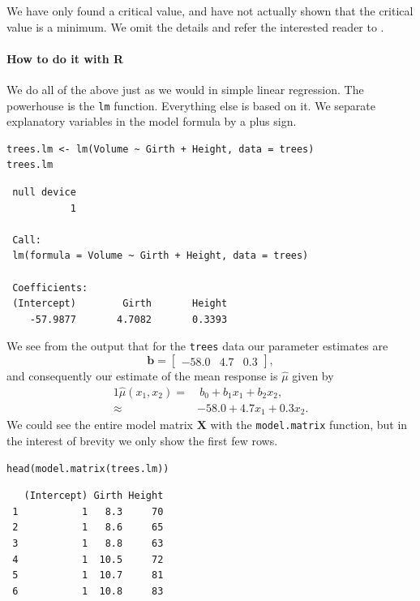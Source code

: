 \documentclass[captions=tableheading]{scrbook}
\begin{document}
\begin{rem}
We have only found a critical value, and have not actually shown that the critical value is a minimum. We omit the details and refer the interested reader to \cite{Rao1999}.
\end{rem}

\paragraph*{How to do it with \textsf{R}}

We do all of the above just as we would in simple linear regression. The powerhouse is the \texttt{lm} function. Everything else is based on it. We separate explanatory variables in the model formula by a plus sign.


\begin{verbatim}
trees.lm <- lm(Volume ~ Girth + Height, data = trees)
trees.lm
\end{verbatim}

\begin{verbatim}
 null device 
           1
  
 Call:
 lm(formula = Volume ~ Girth + Height, data = trees)
 
 Coefficients:
 (Intercept)        Girth       Height  
    -57.9877       4.7082       0.3393
\end{verbatim}

We see from the output that for the \texttt{trees} data our parameter estimates are 
\[
\mathbf{b}=\begin{bmatrix}-58.0 & 4.7 & 0.3\end{bmatrix},
\] 
and consequently our estimate of the mean response is \(\hat{\mu}\) given by 
\begin{alignat}{1}
\hat{\mu}(x_{1},x_{2})= & \ b_{0}+b_{1}x_{1}+b_{2}x_{2},\\
\approx & -58.0+4.7x_{1}+0.3x_{2}.
\end{alignat}
We could see the entire model matrix \(\mathbf{X}\) with the \texttt{model.matrix} function, but in the interest of brevity we only show the first few rows. 


\begin{verbatim}
head(model.matrix(trees.lm))
\end{verbatim}

\begin{verbatim}
   (Intercept) Girth Height
 1           1   8.3     70
 2           1   8.6     65
 3           1   8.8     63
 4           1  10.5     72
 5           1  10.7     81
 6           1  10.8     83
\end{verbatim}
\end{document}
